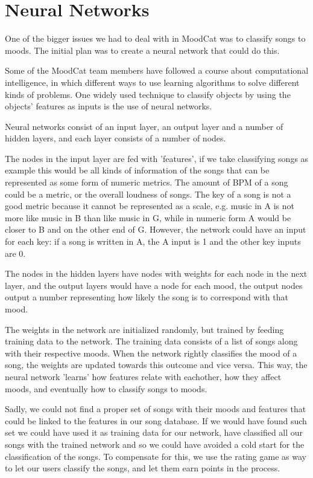 \chapter{Neural Networks}

One of the bigger issues we had to deal with in MoodCat was to classify songs
to moods. The initial plan was to create a neural network that could do this.

Some of the MoodCat team members have followed a course about computational intelligence,
in which different ways to use learning algorithms to solve different kinds of problems.
One widely used technique to classify objects by using the objects' features as inputs
is the use of neural networks.

Neural networks consist of an input layer, an output layer and a number of hidden layers, 
and each layer consists of a number of nodes.

The nodes in the input layer are fed with 'features', if we take classifying songs as example
this would be all kinds of information of the songs that can be represented as some form
of numeric metrics. The amount of BPM of a song could be a metric, or the overall loudness
of songs. The key of a song is not a good metric because it cannot be represented as a scale,
e.g. music in A is not more like music in B than like music in G, while in numeric form A would be closer to B and on the other end of G.
However, the network could have an input for each key: if a song is written in A, the A input is 1 and the other key inputs
are 0.

The nodes in the hidden layers have nodes with weights for each node in the next layer,
and the output layers would have a node for each mood, the output nodes output a number representing how likely the song
is to correspond with that mood.

The weights in the network are initialized randomly, but trained by feeding training data to the network.
The training data consists of a list of songs along with their respective moods. When the network rightly classifies
the mood of a song, the weights are updated towards this outcome and vice versa. This way, the neural
network 'learns' how features relate with eachother, how they affect moods, and eventually how to classify songs to moods.

Sadly, we could not find a proper set of songs with their moods and features that could be linked to the features in our song database.
If we would have found such set we could have used it as training data for our network, have classified all our songs with the
trained network and so we could have avoided a cold start for the classification of the songs.
To compensate for this, we use the rating game as way to let our users classify the songs, and let them
earn points in the process.

\begin{figure}
	\centering
	\def\svgwidth{2in}
	
\end{figure}
